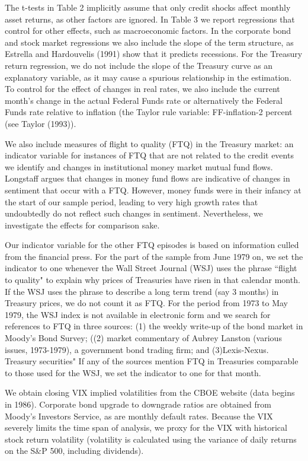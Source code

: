 \documentclass[titlepage,11pt]{article}
\begin{document}
The t-tests in Table 2 implicitly assume that only credit shocks
affect monthly asset returns, as other factors are ignored. In
Table 3 we report regressions that control for other effects,
such as macroeconomic factors. In the corporate bond and stock
market regressions we also include the slope of the term structure,
as Estrella and Hardouvelis (1991) show that it predicts recessions.
For the Treasury return regression, we do not include the
slope of the Treasury curve as an explanatory variable, as it may
cause a spurious relationship in the estimation. To control for the
effect of changes in real rates, we also include the current month's
change in the actual Federal Funds rate or alternatively the Federal
Funds rate relative to inflation (the Taylor rule variable:
FF-inflation-2 percent (see Taylor (1993)).

We also include measures of flight to quality (FTQ) in the Treasury
market: an indicator variable for instances of FTQ
that are not related to the credit events we identify and
changes in institutional money market mutual fund flows.
Longstaff argues that changes in money fund flows are indicative of changes
in sentiment that occur with a FTQ.  However, money funds were in their infancy
at the start of our sample period, leading to very high growth rates that
undoubtedly
do not reflect such changes in sentiment. Nevertheless, we investigate the
effects
for comparison sake.

Our indicator variable for the other FTQ episodes is
based on information culled from the financial press. For the part
of the sample from June 1979 on, we set the indicator to one
whenever the Wall Street Journal (WSJ) uses the phrase ``flight to
quality" to explain why prices of Treasuries have risen in that
calendar month.  If the WSJ uses the phrase to describe a long term
trend (say 3 months) in Treasury prices, we do not count it as FTQ.
For the period from 1973 to May 1979, the WSJ index is not
available in electronic form and we search for references to FTQ in three
sources:
(1) the weekly write-up of the bond market in Moody's Bond Survey; ((2) market
commentary of Aubrey Lanston (various issues, 1973-1979), a
government bond trading firm; and (3)Lexis-Nexus.
Treasury securities"
If any of the sources mention FTQ in Treasuries
comparable to those used for the WSJ, we set the indicator to one
for that month.

We obtain closing VIX implied volatilities from the CBOE website
(data begins in 1986). Corporate bond upgrade to
downgrade ratios are obtained from Moody's Investors Service, as are
monthly default rates.  Because the VIX severely limits the time
span of analysis, we proxy for the VIX with historical stock return
volatility (volatility is calculated using the variance of daily
returns on the S\&P 500, including dividends).
\end{document}
